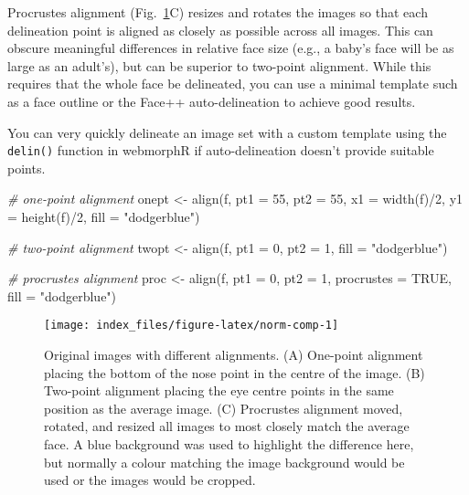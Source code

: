 \documentclass[
  doc,floatsintext]{apa6}
\newenvironment{Shaded}{\begin{snugshade}}{\end{snugshade}}
\newcommand{\AttributeTok}[1]{\textcolor[rgb]{0.77,0.63,0.00}{#1}}
\newcommand{\CommentTok}[1]{\textcolor[rgb]{0.56,0.35,0.01}{\textit{#1}}}
\newcommand{\ConstantTok}[1]{\textcolor[rgb]{0.00,0.00,0.00}{#1}}
\newcommand{\DecValTok}[1]{\textcolor[rgb]{0.00,0.00,0.81}{#1}}
\newcommand{\FunctionTok}[1]{\textcolor[rgb]{0.00,0.00,0.00}{#1}}
\newcommand{\NormalTok}[1]{#1}
\newcommand{\OtherTok}[1]{\textcolor[rgb]{0.56,0.35,0.01}{#1}}
\newcommand{\SpecialCharTok}[1]{\textcolor[rgb]{0.00,0.00,0.00}{#1}}
\newcommand{\StringTok}[1]{\textcolor[rgb]{0.31,0.60,0.02}{#1}}
\begin{document}
Procrustes alignment (Fig.~\ref{fig:norm-comp}C) resizes and rotates the images so that each delineation point is aligned as closely as possible across all images. This can obscure meaningful differences in relative face size (e.g., a baby's face will be as large as an adult's), but can be superior to two-point alignment. While this requires that the whole face be delineated, you can use a minimal template such as a face outline or the Face++ auto-delineation to achieve good results.

You can very quickly delineate an image set with a custom template using the \texttt{delin()} function in webmorphR if auto-delineation doesn't provide suitable points.

\begin{Shaded}
\begin{Highlighting}[]
\CommentTok{\# one{-}point alignment}
\NormalTok{onept }\OtherTok{\textless{}{-}} \FunctionTok{align}\NormalTok{(f, }\AttributeTok{pt1 =} \DecValTok{55}\NormalTok{, }\AttributeTok{pt2 =} \DecValTok{55}\NormalTok{,}
               \AttributeTok{x1 =} \FunctionTok{width}\NormalTok{(f)}\SpecialCharTok{/}\DecValTok{2}\NormalTok{, }\AttributeTok{y1 =} \FunctionTok{height}\NormalTok{(f)}\SpecialCharTok{/}\DecValTok{2}\NormalTok{,}
               \AttributeTok{fill =} \StringTok{"dodgerblue"}\NormalTok{)}

\CommentTok{\# two{-}point alignment}
\NormalTok{twopt }\OtherTok{\textless{}{-}} \FunctionTok{align}\NormalTok{(f, }\AttributeTok{pt1 =} \DecValTok{0}\NormalTok{, }\AttributeTok{pt2 =} \DecValTok{1}\NormalTok{, }\AttributeTok{fill =} \StringTok{"dodgerblue"}\NormalTok{)}

\CommentTok{\# procrustes alignment}
\NormalTok{proc }\OtherTok{\textless{}{-}} \FunctionTok{align}\NormalTok{(f, }\AttributeTok{pt1 =} \DecValTok{0}\NormalTok{, }\AttributeTok{pt2 =} \DecValTok{1}\NormalTok{, }\AttributeTok{procrustes =} \ConstantTok{TRUE}\NormalTok{, }\AttributeTok{fill =} \StringTok{"dodgerblue"}\NormalTok{)}
\end{Highlighting}
\end{Shaded}

\begin{figure}
\texttt{[image: index\_files/figure-latex/norm-comp-1]} \caption{Original images with different alignments. (A) One-point alignment placing the bottom of the nose point in the centre of the image. (B) Two-point alignment placing the eye centre points in the same position as the average image. (C) Procrustes alignment moved, rotated, and resized all images to most closely match the average face. A blue background was used to highlight the difference here, but normally a colour matching the image background would be used or the images would be cropped.}\label{fig:norm-comp}
\end{figure}
\end{document}
